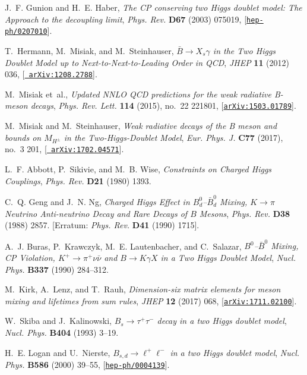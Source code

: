 \documentclass[a4paper, 11pt,notoc]{article}
\begin{document}
\begin{thebibliography}{100}
J.~F. Gunion and H.~E. Haber, {\it {The CP conserving two Higgs doublet model:
  The Approach to the decoupling limit}},  {\em Phys. Rev.} {\bf D67} (2003)
  075019, [\href{http://arxiv.org/abs/hep-ph/0207010}{{\tt hep-ph/0207010}}].

T.~Hermann, M.~Misiak, and M.~Steinhauser, {\it {$\bar{B}\to X_s \gamma$ in the
  Two Higgs Doublet Model up to Next-to-Next-to-Leading Order in QCD}},  {\em
  JHEP} {\bf 11} (2012) 036, [\href{http://arxiv.org/abs/1208.2788}{{\tt
  arXiv:1208.2788}}].

M.~Misiak et~al., {\it {Updated NNLO QCD predictions for the weak radiative
  B-meson decays}},  {\em Phys. Rev. Lett.} {\bf 114} (2015), no.~22 221801,
  [\href{http://arxiv.org/abs/1503.01789}{{\tt arXiv:1503.01789}}].

M.~Misiak and M.~Steinhauser, {\it {Weak radiative decays of the B meson and
  bounds on $M_{H^\pm }$ in the Two-Higgs-Doublet Model}},  {\em Eur. Phys. J.}
  {\bf C77} (2017), no.~3 201, [\href{http://arxiv.org/abs/1702.04571}{{\tt
  arXiv:1702.04571}}].

L.~F. Abbott, P.~Sikivie, and M.~B. Wise, {\it {Constraints on Charged Higgs
  Couplings}},  {\em Phys. Rev.} {\bf D21} (1980) 1393.

C.~Q. Geng and J.~N. Ng, {\it {Charged Higgs Effect in $B_d^0$--$\bar B_d^0$
  Mixing, $K \to \pi$ Neutrino Anti-neutrino Decay and Rare Decays of $B$
  Mesons}},  {\em Phys. Rev.} {\bf D38} (1988) 2857. [Erratum: {\it Phys. Rev.}
  {\bf D41} (1990) 1715].

A.~J. Buras, P.~Krawczyk, M.~E. Lautenbacher, and C.~Salazar, {\it
  {$B^0$--$\bar B^0$ Mixing, {CP} Violation, $K^+ \to \pi^+ \nu \bar{\nu}$ and
  $B \to K \gamma X$ in a Two Higgs Doublet Model}},  {\em Nucl. Phys.} {\bf
  B337} (1990) 284--312.

M.~Kirk, A.~Lenz, and T.~Rauh, {\it {Dimension-six matrix elements for meson
  mixing and lifetimes from sum rules}},  {\em JHEP} {\bf 12} (2017) 068,
  [\href{http://arxiv.org/abs/1711.02100}{{\tt arXiv:1711.02100}}].

W.~Skiba and J.~Kalinowski, {\it {$B_s \to \tau^{+} \tau^{-}$ decay in a two
  Higgs doublet model}},  {\em Nucl. Phys.} {\bf B404} (1993) 3--19.

H.~E. Logan and U.~Nierste, {\it {$B_{s,d} \to \ell^+ \ell^-$ in a two Higgs
  doublet model}},  {\em Nucl. Phys.} {\bf B586} (2000) 39--55,
  [\href{http://arxiv.org/abs/hep-ph/0004139}{{\tt hep-ph/0004139}}].


\end{thebibliography}
\end{document}
